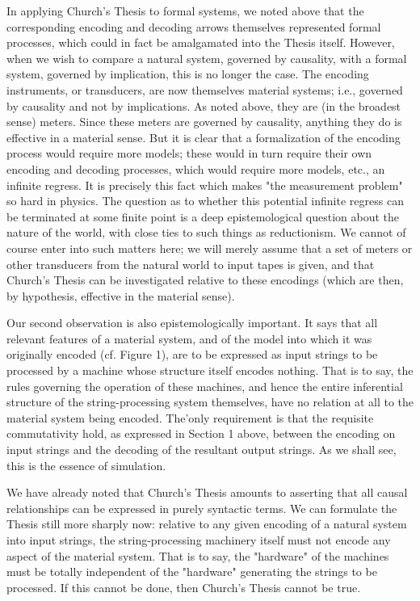 \documentclass[a4paper,12pt]{article}
\begin{document}
In applying Church's Thesis to formal systems, we noted above that the
corresponding encoding and decoding arrows themselves represented formal processes, which could in fact be amalgamated into
the Thesis itself. However, when we wish to compare a natural system, governed by causality, with a formal system, governed by
implication, this is no longer the case. The encoding instruments, or transducers, are now themselves material systems;
i.e., governed by causality and not by implications. As noted above, they are (in the broadest sense) meters. Since these meters are governed by
causality, anything they do is effective in a material sense. But it is clear that a formalization of the encoding process would require more models;
these would in turn require their own encoding and decoding processes, which would require more models, etc., an infinite regress.
It is precisely this fact which makes "the measurement problem" so hard in physics. The question as to whether this potential infinite regress
can be terminated at some finite point is a deep epistemological question about the nature of the world, with close ties to such things as
reductionism. We cannot of course enter into such matters here; we will merely assume that a set of meters or other transducers
from the natural world to input tapes is given, and that Church's Thesis can be investigated relative to these encodings
(which are then, by hypothesis, effective in the material sense).

Our second observation is also epistemologically important. It says that
all relevant features of a material system, and of the model into which it
was originally encoded (cf. Figure 1), are to be expressed as input strings to
be processed by a machine whose structure itself encodes nothing. That is to
say, the rules governing the operation of these machines, and hence the entire
inferential structure of the string-processing system themselves, have no
relation at all to the material system being encoded. The'only requirement
is that the requisite commutativity hold, as expressed in Section 1 above,
between the encoding on input strings and the decoding of the resultant
output strings. As we shall see, this is the essence of simulation.

We have already noted that Church's Thesis amounts to asserting that
all causal relationships can be expressed in purely syntactic terms. We can
formulate the Thesis still more sharply now: relative to any given encoding
of a natural system into input strings, the string-processing machinery itself
must not encode any aspect of the material system.  That is to say, the
"hardware" of the machines must be totally independent of the "hardware"
generating the strings to be processed. If this cannot be done, then Church's
Thesis cannot be true.
\end{document}
